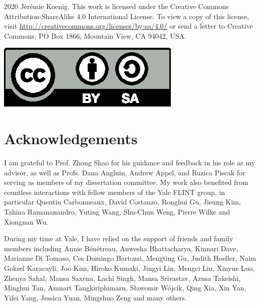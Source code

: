 \documentclass[11pt,oneside]{book}
\theoremstyle{definition}
\begin{document}
\setcounter{page}{2}

\vspace*{3in}
\thispagestyle{empty}%
\noindent
\begin{minipage}{.815\textwidth}
  \textcopyright{} 2020 J\'er\'emie Koenig.
  This work is licensed under
  the Creative Commons Attribution-ShareAlike 4.0 International License.
  To view a copy of this license,
  visit \url{http://creativecommons.org/licenses/by-sa/4.0/}
  or send a letter to
  Creative Commons, PO Box 1866, Mountain View, CA 94042, USA.
\end{minipage}
\hfill
  \includegraphics[width=.15\textwidth]{by-sa}

\doublespacing
\pagestyle{myheadings}

\cleardoublepage
{}
{}
\tableofcontents

\cleardoublepage
{}
{}
\listoffigures

\cleardoublepage
{}
{}
\listoftables

\chapter{Acknowledgements} %

I am grateful to Prof. Zhong Shao for his guidance and feedback
in his role as my advisor,
as well as Profs. Dana Angluin, Andrew Appel, and Ruzica Piscak
for serving as members of my dissertation committee.
My work also benefited from countless interactions
with fellow members of the Yale FLINT group,
in particular
Quentin Carbonneaux,
David Costanzo,
Ronghui Gu,
Jieung Kim,
Tahina Ramananandro,
Yuting Wang,
Shu-Chun Weng,
Pierre Wilke and
Xiongnan Wu.

During my time at Yale,
I have relied on the support of friends and family members
including
Annie B\'en\'etreau,
Anwesha Bhattacharya,
Kinnari Dave,
Marianne Di Tomaso,
Ces Domingo Bartozzi,
Mengting Gu,
Judith Hoeller,
Naim Goksel Karacayli,
Joo Kim,
Hiroko Kumaki,
Jingyi Lin,
Mengci Liu,
Xinyue Luo,
Zhenya Sakal,
Mansa Saxena,
Lachi Singh,
Mansa Srivastav,
Azusa Takeishi,
Minghui Tan,
Amnart Tangkiriphimarn,
S\l{}awomir W\'ojcik,
Qing Xia,
Xin Yan,
Yifei Yang,
Jessica Yuan,
Mingshuo Zeng
and many others.
\end{document}
